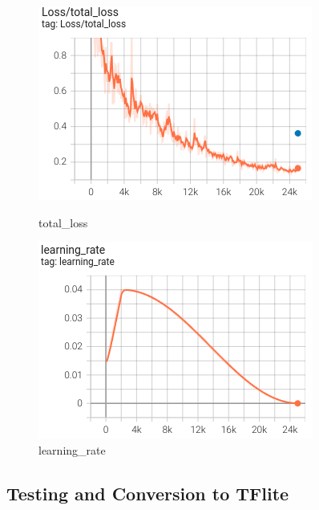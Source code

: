 \documentclass[10pt]{article}
\begin{document}
	\begin{figure}[H]
		\centering
		\begin{minipage}[b]{0.45\textwidth}
			\includegraphics[width=\textwidth]{imgs/total_loss.png}
			\caption{total\_loss}
		\end{minipage}
		\hfill
		\begin{minipage}[b]{0.45\textwidth}
			\includegraphics[width=\textwidth]{imgs/learning_rate.png}
			\caption{learning\_rate}
		\end{minipage}
	\end{figure}

	\pagebreak

	\subsection{Testing and Conversion to TFlite}
\end{document}
